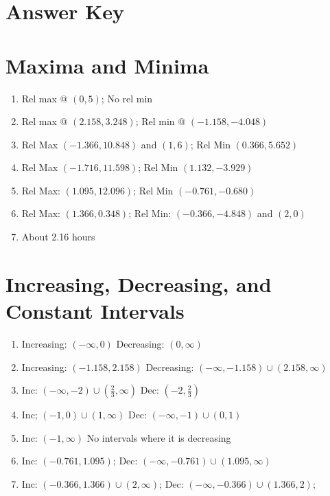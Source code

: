 \newpage

\section{Answer Key}

\section*{Maxima and Minima}

\begin{enumerate}
	\item Rel max @ $(0,5)$; No rel min
	\item Rel max @ $(2.158, 3.248)$; Rel min @ $(-1.158, -4.048)$
	\item Rel Max $(-1.366,10.848)$ and $(1,6)$; \quad Rel Min $(0.366,5.652)$
    \item Rel Max $(-1.716,11.598)$; \quad Rel Min $(1.132,-3.929)$
    \item Rel Max: $(1.095, 12.096)$; \quad Rel Min $(-0.761, -0.680)$
    \item Rel Max: $(1.366, 0.348)$; \quad
    Rel Min: $(-0.366, -4.848)$ and $(2,0)$
	\item About 2.16 hours
\end{enumerate}

\section*{Increasing, Decreasing, and Constant Intervals}

\begin{enumerate}
	\item Increasing: $(-\infty, 0)$ \quad Decreasing: $(0, \infty)$
	\item Increasing: $(-1.158, 2.158)$ \quad Decreasing: $(-\infty, -1.158) \cup (2.158, \infty)$
    \item Inc: $(-\infty,-2) \cup \left(\frac{2}{3},\infty\right)$ \quad Dec: $\left(-2, \frac{2}{3}\right)$
    \item Inc; $(-1,0) \cup (1, \infty)$ \quad Dec: $(-\infty, -1) \cup (0,1)$
    \item Inc: $(-1,\infty)$ \quad No intervals where it is decreasing
    \item Inc: $(-0.761, 1.095)$; \quad Dec: $(-\infty, -0.761) \cup (1.095, \infty)$
    \item Inc: $(-0.366,1.366) \cup (2, \infty)$; \quad
    Dec: $(-\infty, -0.366) \cup (1.366,2)$;
\end{enumerate}


